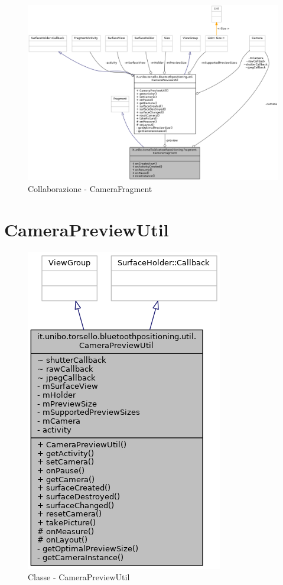 \begin{figure}[ph]
	\centering
	\includegraphics[width=1.5\linewidth, angle=90]{img/uml/class/classit_1_1unibo_1_1torsello_1_1bluetoothpositioning_1_1fragment_1_1CameraFragment__coll__graph.png}
	\caption{Collaborazione - CameraFragment}
\end{figure}

\newpage
\section{CameraPreviewUtil}
\begin{figure}[ph]
	\centering
	\includegraphics[width=0.5\linewidth]{img/uml/class/classit_1_1unibo_1_1torsello_1_1bluetoothpositioning_1_1util_1_1CameraPreviewUtil__inherit__graph.png}
	\caption{Classe - CameraPreviewUtil}
\end{figure}

